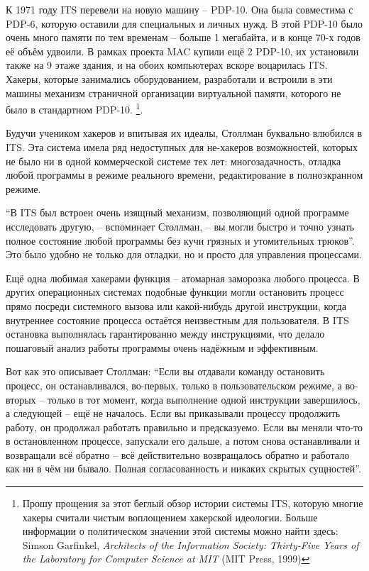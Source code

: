 К 1971 году ITS перевели на новую машину -- PDP-10. Она была совместима с PDP-6, которую оставили для специальных и личных нужд. В этой PDP-10 было очень много памяти по тем временам -- больше 1 мегабайта, и в конце 70-х годов её объём удвоили. В рамках проекта MAC купили ещё 2 PDP-10, их установили также на 9 этаже здания, и на обоих компьютерах вскоре воцарилась ITS. Хакеры, которые занимались оборудованием, разработали и встроили в эти машины механизм страничной организации виртуальной памяти, которого не было в стандартном PDP-10. \footnote{Прошу прощения за этот беглый обзор истории системы ITS, которую многие хакеры считали чистым воплощением хакерской идеологии. Больше информации о политическом значении этой системы можно найти здесь: Simson Garfinkel, \textit{Architects of the Information Society: Thirty-Five Years of the Laboratory for Computer Science at MIT} (MIT Press, 1999)}.

Будучи учеником хакеров и впитывая их идеалы, Столлман буквально влюбился в ITS. Эта система имела ряд недоступных для не-хакеров возможностей, которых не было ни в одной коммерческой системе тех лет: многозадачность, отладка любой программы в режиме реального времени, редактирование в полноэкранном режиме.

\enquote{В ITS был встроен очень изящный механизм, позволяющий одной программе исследовать другую, -- вспоминает Столлман, -- вы могли быстро и точно узнать полное состояние любой программы без кучи грязных и утомительных трюков}. Это было удобно не только для отладки, но и просто для управления процессами.

Ещё одна любимая хакерами функция -- атомарная заморозка любого процесса. В других операционных системах подобные функции могли остановить процесс прямо посреди системного вызова или какой-нибудь другой инструкции, когда внутреннее состояние процесса остаётся неизвестным для пользователя. В ITS остановка выполнялась гарантированно между инструкциями, что делало пошаговый анализ работы программы очень надёжным и эффективным.

Вот как это описывает Столлман: \enquote{Если вы отдавали команду остановить процесс, он останавливался, во-первых, только в пользовательском режиме, а во-вторых -- только в тот момент, когда выполнение одной инструкции завершилось, а следующей -- ещё не началось. Если вы приказывали процессу продолжить работу, он продолжал работать правильно и предсказуемо. Если вы меняли что-то в остановленном процессе, запускали его дальше, а потом снова останавливали и возвращали всё обратно -- всё действительно возвращалось обратно и работало как ни в чём ни бывало. Полная согласованность и никаких скрытых сущностей}.

